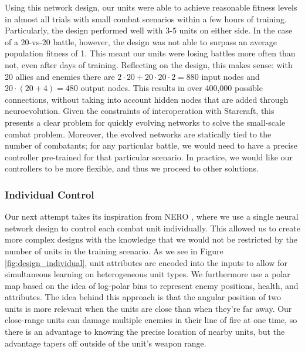 \documentclass[10pt,a4paper,twocolumn]{article}
\begin{document}
Using this network design, our units were able to achieve reasonable fitness levels in almost all trials with small combat scenarios within a few hours of training. Particularly, the design performed well with 3-5 units on either side. In the case of a 20-vs-20 battle, however, the design was not able to surpass an average population fitness of 1. This meant our units were losing battles more often than not, even after days of training. Reflecting on the design, this makes sense: with 20 allies and enemies there are $2 \cdot 20 + 20\cdot 20 \cdot 2 = 880$ input nodes and $20 \cdot (20 + 4) = 480$ output nodes. This results in over 400,000 possible connections, without taking into account hidden nodes that are added through neuroevolution. Given the constraints of interoperation with Starcraft, this presents a clear problem for quickly evolving networks to solve the small-scale combat problem. Moreover, the evolved networks are statically tied to the number of combatants; for any particular battle, we would need to have a precise controller pre-trained for that particular scenario. In practice, we would like our controllers to be more flexible, and thus we proceed to other solutions.

\subsubsection{Individual Control}
\label{sec:individual_design}

Our next attempt takes its inspiration from NERO \cite{stanley:ieeetec05}, where we use a single neural network design to control each combat unit individually. This allowed us to create more complex designs with the knowledge that we would not be restricted by the number of units in the training scenario. As we see in Figure \ref{fig:design_individual}, unit attributes are encoded into the inputs to allow for simultaneous learning on heterogeneous unit types. We furthermore use a polar map based on the idea of log-polar bins to represent enemy positions, health, and attributes. The idea behind this approach is that the angular position of two units is more relevant when the units are close than when they're far away. Our close-range units can damage multiple enemies in their line of fire at one time, so there is an advantage to knowing the precise location of nearby units, but the advantage tapers off outside of the unit's weapon range. 
\end{document}
